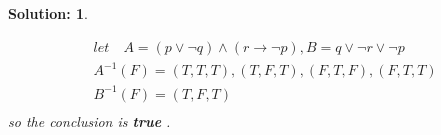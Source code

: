 \documentclass{article}
\theoremstyle{break}
\newtheorem*{solution*}{\textbf{Solution:} }
\begin{document}
\begin{enumerate}
\begin{solution*}
\begin{enumerate}
\begin{equation*}
\begin{aligned}
                    & let \quad A = ( p \lor \lnot q) \land (r \to \lnot p) ,  B =  q \lor  \lnot r \lor \lnot p\\
                    & A^{-1}(F) = (T,T,T),(T,F,T),(F,T,F),(F,T,T)\\
                    & B^{-1}(F) = (T,F,T) \\    
                \end{aligned}
            \end{equation*}
            so the conclusion is \textbf{true} .
        \end{enumerate}
    \end{solution*}


    \end{enumerate}
    
\end{document}
